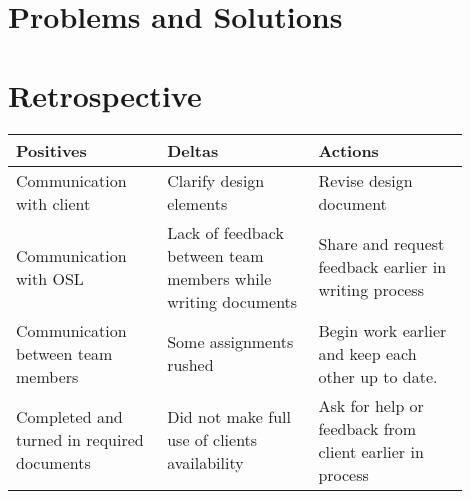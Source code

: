 \documentclass[10pt,onecolumn,journal,draftclsnofoot]{IEEEtran}
\begin{document}
\section{Problems and Solutions}

\section{Retrospective}
\begin{center}
	\begin{tabular}{| p{0.3\linewidth} | p{0.3\linewidth} | p{0.3\linewidth} |}\hline
		Positives & Deltas & Actions \\ \hline
		Communication with client & Clarify design elements 	& Revise design document \\ \hline
		Communication with OSL & Lack of feedback between team members while writing documents & Share and request feedback earlier in writing process \\ \hline
		Communication between team members	& Some assignments rushed & Begin work earlier and keep each other up to date. \\ \hline
		Completed and turned in required documents & Did not make full use of clients availability & Ask for help or feedback from client earlier in process \\ \hline
	\end{tabular}
\end{center}
\end{document}
